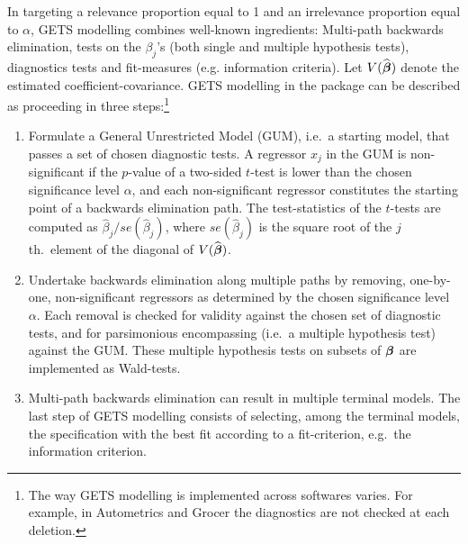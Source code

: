 In targeting a relevance proportion equal to 1 and an irrelevance proportion equal to $\alpha$, GETS modelling combines well-known ingredients: Multi-path backwards elimination, tests on the $\beta_j$'s (both single and multiple hypothesis tests), diagnostics tests and fit-measures (e.g. information criteria). Let $V(\widehat{\boldsymbol{\beta}})$ denote the estimated coefficient-covariance. GETS modelling in the package  can be described as proceeding in three steps:\footnote{The way GETS modelling is implemented across softwares varies. For example, in Autometrics and Grocer the diagnostics are not checked at each deletion.} 

\begin{enumerate}
	\item Formulate a General Unrestricted Model (GUM), i.e.\ a starting model, that passes a set of chosen diagnostic tests. A regressor $x_j$ in the GUM is non-significant if the $p$-value of a two-sided $t$-test is lower than the chosen significance level $\alpha$, and each non-significant regressor constitutes the starting point of a backwards elimination path. The test-statistics of the $t$-tests are computed as $\widehat{\beta}_j/se(\widehat{\beta}_j)$, where $se(\widehat{\beta}_j)$ is the square root of the $j$th.\ element of the diagonal of $V(\widehat{\boldsymbol{\beta}})$.
	
	\item Undertake backwards elimination along multiple paths by removing, one-by-one, non-significant regressors as determined by the chosen significance level $\alpha$. Each removal is checked for validity against the chosen set of diagnostic tests, and for parsimonious encompassing (i.e.\ a multiple hypothesis test) against the GUM. These multiple hypothesis tests on subsets of $\boldsymbol{\beta}$ are implemented as Wald-tests. %
	
	\item Multi-path backwards elimination can result in multiple terminal models. The last step of GETS modelling consists of selecting, among the terminal models, the specification with the best fit according to a fit-criterion, e.g.\ the \cite{Schwarz1978} information criterion. 
\end{enumerate}

